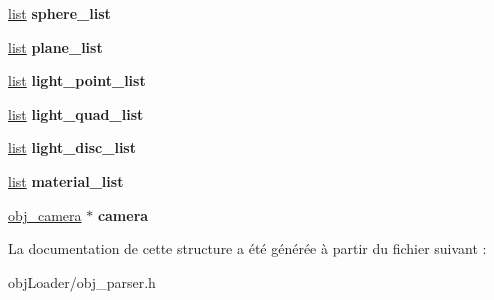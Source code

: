 \begin{DoxyCompactItemize}
\item 
\hypertarget{structobj__growable__scene__data_a5c49ed985e0f8bddf535807b840618f3}{\hyperlink{structlist}{list} {\bfseries sphere\-\_\-list}}\label{structobj__growable__scene__data_a5c49ed985e0f8bddf535807b840618f3}

\item 
\hypertarget{structobj__growable__scene__data_aea6999082b6a4000f5753ab81e30806b}{\hyperlink{structlist}{list} {\bfseries plane\-\_\-list}}\label{structobj__growable__scene__data_aea6999082b6a4000f5753ab81e30806b}

\item 
\hypertarget{structobj__growable__scene__data_a78cb39927508e8622f328756a954c50d}{\hyperlink{structlist}{list} {\bfseries light\-\_\-point\-\_\-list}}\label{structobj__growable__scene__data_a78cb39927508e8622f328756a954c50d}

\item 
\hypertarget{structobj__growable__scene__data_a64d1574b4bae19b123e8cb3f6688555f}{\hyperlink{structlist}{list} {\bfseries light\-\_\-quad\-\_\-list}}\label{structobj__growable__scene__data_a64d1574b4bae19b123e8cb3f6688555f}

\item 
\hypertarget{structobj__growable__scene__data_a774c6e71151e61488452babc59db667c}{\hyperlink{structlist}{list} {\bfseries light\-\_\-disc\-\_\-list}}\label{structobj__growable__scene__data_a774c6e71151e61488452babc59db667c}

\item 
\hypertarget{structobj__growable__scene__data_ad271be9b71b2dfd6fbadd5bf69e74bf5}{\hyperlink{structlist}{list} {\bfseries material\-\_\-list}}\label{structobj__growable__scene__data_ad271be9b71b2dfd6fbadd5bf69e74bf5}

\item 
\hypertarget{structobj__growable__scene__data_a44df213a8051ff348dbeba280ee7112c}{\hyperlink{structobj__camera}{obj\-\_\-camera} $\ast$ {\bfseries camera}}\label{structobj__growable__scene__data_a44df213a8051ff348dbeba280ee7112c}

\end{DoxyCompactItemize}


La documentation de cette structure a été générée à partir du fichier suivant \-:\begin{DoxyCompactItemize}
\item 
obj\-Loader/obj\-\_\-parser.\-h\end{DoxyCompactItemize}
